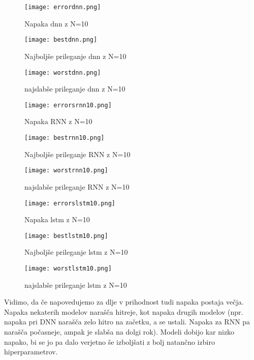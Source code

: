 \documentclass{article}
\begin{document}
\begin{figure}[htb]
    \texttt{[image: errordnn.png]}
    \caption{Napaka dnn z N=10}
\end{figure}
\begin{figure}[htb]
    \texttt{[image: bestdnn.png]}
    \caption{Najboljše prileganje dnn z N=10}
\end{figure}
\begin{figure}[htb]
    \texttt{[image: worstdnn.png]}
    \caption{najslabše prileganje dnn z N=10}
\end{figure}

\begin{figure}[htb]
    \texttt{[image: errorsrnn10.png]}
    \caption{Napaka RNN z N=10}
\end{figure}
\begin{figure}[htb]
    \texttt{[image: bestrnn10.png]}
    \caption{Najboljše prileganje RNN z N=10}
\end{figure}
\begin{figure}[htb]
    \texttt{[image: worstrnn10.png]}
    \caption{najslabše prileganje RNN z N=10}
\end{figure}

\begin{figure}[htb]
    \texttt{[image: errorslstm10.png]}
    \caption{Napaka lstm z N=10}
\end{figure}
\begin{figure}[htb]
    \texttt{[image: bestlstm10.png]}
    \caption{Najboljše prileganje lstm z N=10}
\end{figure}
\begin{figure}[htb]
    \texttt{[image: worstlstm10.png]}
    \caption{najslabše prileganje lstm z N=10}
\end{figure}

Vidimo, da če napovedujemo za dlje v prihodnost tudi napaka postaja večja. Napaka nekaterih modelov narašča hitreje, kot napaka drugih modelov (npr. napaka pri DNN narašča zelo hitro na začetku, a se ustali. Napaka za RNN pa narašča počasneje, ampak je slabša na dolgi rok). Modeli dobijo kar nizko napako, bi se jo pa dalo verjetno še izboljšati z bolj natančno izbiro hiperparametrov.
\end{document}
